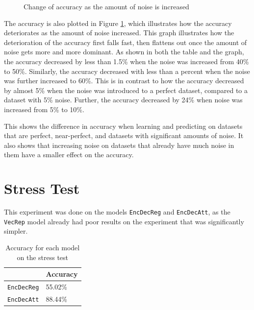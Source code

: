 \begin{figure}[ht]
    \centering
    \captionsetup{justification=centering}
    \caption{Change of accuracy as the amount of noise is increased}
    \label{fig:noise_accuracy}
\end{figure}

The accuracy is also plotted in Figure \ref{fig:noise_accuracy}, which illustrates how the accuracy deteriorates as the amount of noise increased. This graph illustrates how the deterioration of the accuracy first falls fast, then flattens out once the amount of noise gets more and more dominant. As shown in both the table and the graph, the accuracy decreased by less than 1.5\% when the noise was increased from 40\% to 50\%. Similarly, the accuracy decreased with less than a percent when the noise was further increased to 60\%. This is in contrast to how the accuracy decreased by almost 5\% when the noise was introduced to a perfect dataset, compared to a dataset with 5\% noise. Further, the accuracy decreased by 24\% when noise was increased from 5\% to 10\%.

This shows the difference in accuracy when learning and predicting on datasets that are perfect, near-perfect, and datasets with significant amounts of noise. It also shows that increasing noise on datasets that already have much noise in them have a smaller effect on the accuracy.


\section{Stress Test}
\label{sec:stress_test}
This experiment was done on the models {\tt EncDecReg} and {\tt EncDecAtt}, as the {\tt VecRep} model already had poor results on the experiment that was significantly simpler.

\begin{table}[ht]
    \centering
    \begin{tabular}{|l|l|}
        \hline 
                                        & \textbf{Accuracy}         \\ \hline
        {\tt EncDecReg}                 & 55.02\%                   \\ \hline
        {\tt EncDecAtt}                 & 88.44\%                   \\ \hline
    \end{tabular}
    \caption{Accuracy for each model on the stress test}
    \label{table:accuracy_stress_test}
\end{table}


